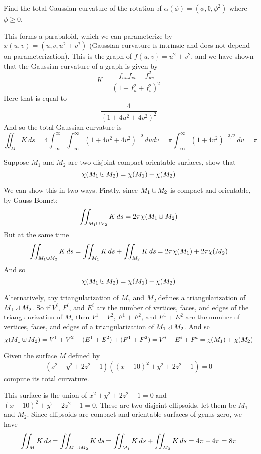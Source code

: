 \documentclass[10pt]{article}
\def\bexerc{\begin{exercise*}}
\def\eexerc{\end{exercise*}}
\begin{document}
\bexerc

    Find the total Gaussian curvature of the rotation of $\alpha(\phi)=(\phi,0,\phi^2)$ where $\phi\geq0$.

\eexerc

This forms a parabaloid, which we can parameterize by $x(u,v)=(u,v,u^2+v^2)$ (Gaussian curvature is intrinsic and does not depend on parameterization).
This is the graph of $f(u,v)=u^2+v^2$, and we have shown that the Gaussian curvature of a graph is given by
\[ K = \frac{f_{uu}f_{vv}-f_{uv}^2}{(1+f_u^2+f_v^2)^2} \]
Here that is equal to
\[ \frac4{(1+4u^2+4v^2)^2} \]
And so the total Gaussian curvature is
\[ \iint_M K\,ds = 4\int_{-\infty}^\infty\int_{-\infty}^\infty(1+4u^2+4v^2)^{-2}\,dudv = \pi\int_{-\infty}^\infty(1+4v^2)^{-3/2}\,dv = \pi \]

\bexerc

    Suppose $M_1$ and $M_2$ are two disjoint compact orientable surfaces, show that
    \[ \chi(M_1\dcup M_2) = \chi(M_1) + \chi(M_2) \]

\eexerc

We can show this in two ways.
Firstly, since $M_1\dcup M_2$ is compact and orientable, by Gauss-Bonnet:
\[ \iint_{M_1\dcup M_2}K\,ds = 2\pi\chi(M_1\dcup M_2) \]
But at the same time
\[ \iint_{M_1\dcup M_2}K\,ds = \iint_{M_1}K\,ds + \iint_{M_2}K\,ds = 2\pi\chi(M_1) + 2\pi\chi(M_2) \]
And so
\[ \chi(M_1\dcup M_2) = \chi(M_1) + \chi(M_2) \]

Alternatively, any triangularization of $M_1$ and $M_2$ defines a triangularization of $M_1\dcup M_2$.
So if $V^i$, $F^i$, and $E^i$ are the number of vertices, faces, and edges of the triangularization of $M_i$ then $V^1+V^2$, $F^1+F^2$, and $E^1+E^2$ are the number of vertices, faces, and edges
of a triangularization of $M_1\dcup M_2$.
And so
\[ \chi(M_1\dcup M_2) = V^1+V^2 - (E^1+E^2) + (F^1+F^2) = V^i - E^i + F^i = \chi(M_1) + \chi(M_2) \]

\bexerc

    Given the surface $M$ defined by
    \[ (x^2+y^2+2z^2-1)((x-10)^2+y^2+2z^2-1) = 0 \]
    compute its total curvature.

\eexerc

This surface is the union of $x^2+y^2+2z^2-1=0$ and $(x-10)^2+y^2+2z^2-1=0$.
These are two disjoint ellipsoids, let them be $M_1$ and $M_2$.
Since ellipsoids are compact and orientable surfaces of genus zero, we have
\[ \iint_M K\,ds = \iint_{M_1\dcup M_2}K\,ds = \iint_{M_1}K\,ds + \iint_{M_2}K\,ds = 4\pi + 4\pi = 8\pi \]
\end{document}
